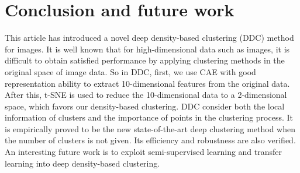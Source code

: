 \documentclass[10pt,twocolumn,letterpaper]{article}
\begin{document}
\section{Conclusion and future work}\label{sec:conclusion}
This article has introduced a novel deep density-based clustering (DDC) method for images. It is well known that for high-dimensional data such as images, it is difficult to obtain satisfied performance by applying clustering methods in the original space of image data. So in DDC, first, we use CAE with good representation ability to extract 10-dimensional features from the original data. After this, t-SNE is used to reduce the 10-dimensional data to a 2-dimensional space, which favors our density-based clustering. DDC consider both the local information of clusters and the importance of points in the clustering process. It is empirically proved to be the new state-of-the-art deep clustering method when the number of clusters is not given. Its efficiency and robustness are also verified. 
An interesting future work is to exploit semi-supervised learning and transfer learning into deep density-based clustering.




{\small


}
\end{document}
